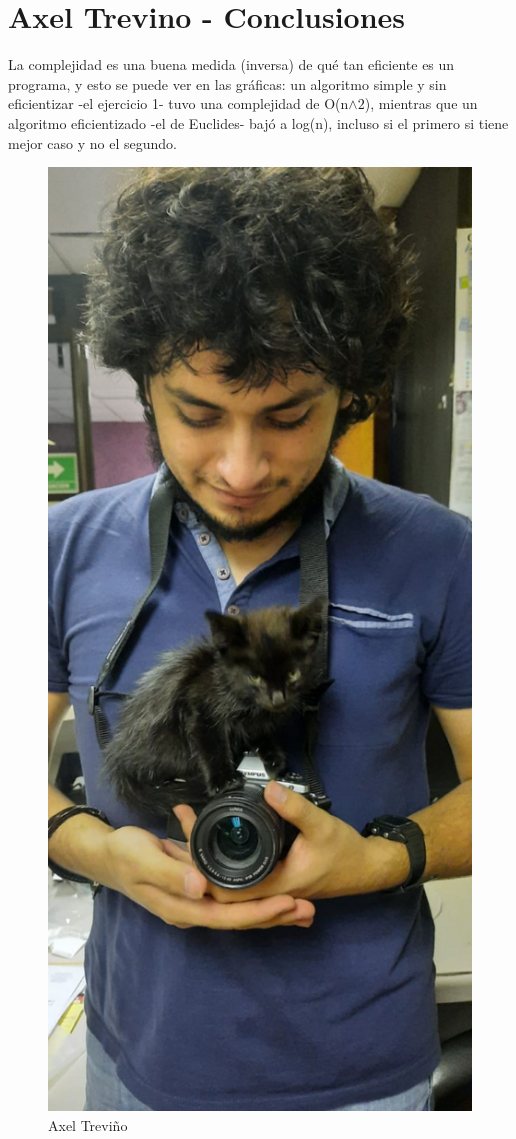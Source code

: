 \newpage
\section{Axel Trevino - Conclusiones}
    La complejidad es una buena medida (inversa) de qué tan eficiente es un programa, y esto se puede ver en las gráficas: un algoritmo simple y sin eficientizar -el ejercicio 1- tuvo una complejidad de O(n$\wedge2$), mientras que un algoritmo eficientizado -el de Euclides- bajó a log(n), incluso si el primero si tiene mejor caso y no el segundo.
    
    \begin{figure}[htp!]
            \centering
            \includegraphics[width=0.4 \textwidth]{Images/Fotos_Alumnos/axel.jpg}  
            \caption{Axel Treviño}
            \label{fig:my_label}
        \end{figure}
